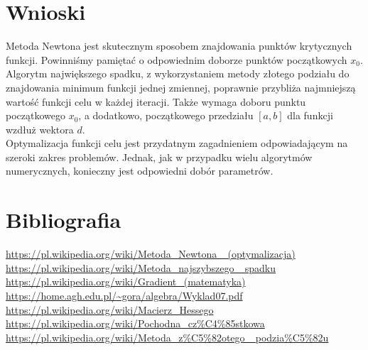 \documentclass[11pt, leqno]{scrartcl}
\begin{document}
    \section{Wnioski}
    Metoda Newtona jest skutecznym sposobem znajdowania punktów
    krytycznych funkcji. Powinniśmy pamiętać o odpowiednim doborze
    punktów początkowych $x_0$. \\
    Algorytm największego spadku, z wykorzystaniem metody złotego
    podziału do znajdowania minimum funkcji jednej zmiennej,
    poprawnie przybliża najmniejszą wartość funkcji celu w każdej
    iteracji. Także wymaga doboru punktu początkowego
    $x_0$, a dodatkowo, początkowego przedziału $[a,b]$ dla funkcji
    wzdłuż wektora $d$. \\
    Optymalizacja funkcji celu jest przydatnym zagadnieniem
    odpowiadającym na szeroki zakres problemów. Jednak, jak w przypadku
    wielu algorytmów numerycznych, konieczny jest odpowiedni
    dobór parametrów.

    \section{Bibliografia}
    \url{https://pl.wikipedia.org/wiki/Metoda_Newtona_
        (optymalizacja)} \\
    \url{https://pl.wikipedia.org/wiki/Metoda_najszybszego_
        spadku} \\
    \url{https://pl.wikipedia.org/wiki/Gradient_(matematyka)} \\
    \url{https://home.agh.edu.pl/~gora/algebra/Wyklad07.pdf} \\
    \url{https://pl.wikipedia.org/wiki/Macierz_Hessego} \\
    \url{https://pl.wikipedia.org/wiki/Pochodna_cz%C4%85stkowa} \\
    \url{https://pl.wikipedia.org/wiki/Metoda_z\%C5\%82otego_
        podzia\%C5\%82u}
\end{document}
